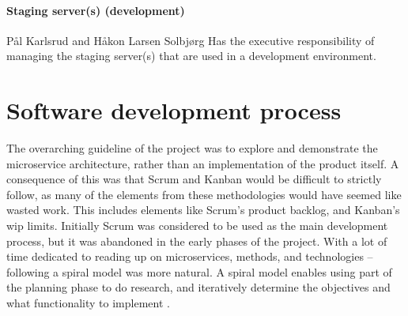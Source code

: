 






\paragraph{Staging server(s) (development)} Pål Karlsrud and Håkon Larsen Solbjørg\newline
Has the executive responsibility of managing the staging server(s) that are used in a development environment.


\section{Software development process}
\label{section:devProcess}
The overarching guideline of the project was to explore and demonstrate the microservice architecture, rather than an implementation of the product itself. 
A consequence of this was that Scrum and Kanban would be difficult to strictly follow, as many of the elements from these methodologies would have seemed like wasted work. This includes elements like Scrum's product backlog, and Kanban's \acrshort{wip} limits. Initially Scrum was considered to be used as the main development process, but it was abandoned in the early phases of the project.
With a lot of time dedicated to reading up on microservices, methods, and technologies -- following a spiral model was more natural. 
A spiral model enables using part of the planning phase to do research, and iteratively determine the objectives and what functionality to implement \citep{sprialModel}.

